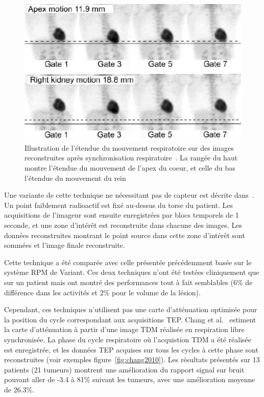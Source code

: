 \begin{figure}[h!]
	\begin{center}
		\includegraphics[width=12cm]{images/gatingBoucher2004}
	\end{center}
	\caption[Illustration de l'étendue du mouvement respiratoire sur des images reconstruites ]{Illustration de l'étendue du mouvement respiratoire sur des images reconstruites après synchronisation respiratoire~\cite{boucher2004respiratory}. La rangée du haut montre l'étendue du mouvement de l'apex du coeur, et celle du bas l'étendue du mouvement du rein} 
	\label{fig:boucher2004}
\end{figure}

Une variante de cette technique ne nécessitant pas de capteur est décrite dans~\cite{nehmeh2003reduction}. Un point faiblement radioactif est fixé au-dessus du torse du patient. Les acquisitions de l'imageur sont ensuite enregistrées par blocs temporels de 1 seconde, et une zone d'intérêt est reconstruite dans chacune des images. Les données reconstruites montrant le point source dans cette zone d'intérêt sont sommées et l'image finale reconstruite. 

Cette technique a été comparée avec celle présentée précédemment basée sur le système RPM de Variant. Ces deux techniques n'ont été testées cliniquement que sur un patient mais ont montré des performances tout à fait semblables (6\% de différence dans les activités et 2\% pour le volume de la lésion).

Cependant, ces techniques n'utilisent pas une carte d'atténuation optimisée pour la position du cycle correspondant aux acquisitions TEP.  Chang et al.~\cite{GuopingChang2010Implementation} estiment la carte d'atténuation à partir d'une image TDM réalisée en respiration libre synchronisée. La phase du cycle respiratoire où l'acquistion TDM a été réalisée est enregistrée, et les données TEP acquises sur tous les cycles à cette phase sont reconstruites (voir exemples figure~\ref{fig:chang2010}). Les résultats présentés sur 13 patients (21 tumeurs) montrent une amélioration du rapport signal sur bruit pouvant aller de -3.4 à 81\% suivant les tumeurs, avec une amélioration moyenne de 26.3\%.

